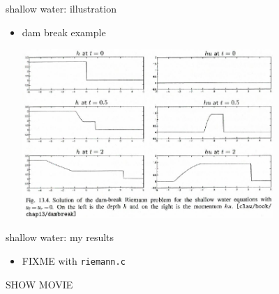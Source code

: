 \documentclass[10pt,hyperref,dvipsnames]{beamer}
\begin{document}
\begin{frame}{shallow water: illustration}

\begin{itemize}
\item dam break example

\hfill \includegraphics[width=0.75\textwidth]{figs/leveque13p4}

\end{itemize}
\end{frame}


\begin{frame}{shallow water: my results}

\begin{itemize}
\item FIXME with \texttt{riemann.c}
\end{itemize}

\vspace{10mm}
\begin{center}
\alert{SHOW MOVIE}
\end{center}
\end{frame}
\end{document}
